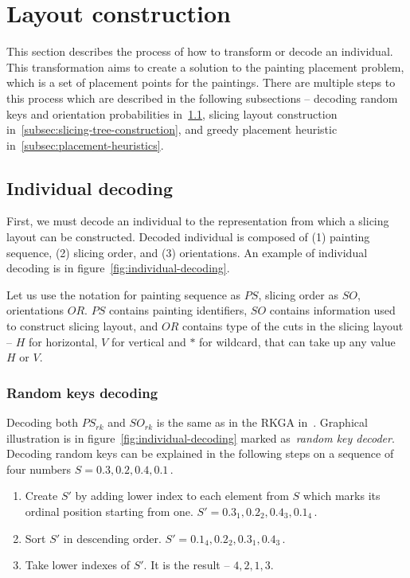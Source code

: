 \section{Layout construction}\label{sec:layout-construction}

This section describes the process of how to transform or decode an individual.
This transformation aims to create a solution to the painting placement problem,
which is a set of placement points for the paintings.
There are multiple steps to this process which are described in the following subsections
– decoding random keys and orientation probabilities in~\ref{subsec:individual-decoding},
slicing layout construction in~\ref{subsec:slicing-tree-construction},
and greedy placement heuristic in~\ref{subsec:placement-heuristics}.

\subsection{Individual decoding}\label{subsec:individual-decoding}
First, we must decode an individual to the representation from which a slicing layout can be constructed.
Decoded individual is composed of (1) painting sequence, (2) slicing order, and (3) orientations.
An example of individual decoding is in figure~\ref{fig:individual-decoding}.

Let us use the notation for painting sequence as $PS$, slicing order as $SO$, orientations $OR$.
$PS$ contains painting identifiers, $SO$ contains information used to construct slicing layout,
and $OR$ contains type of the cuts in the slicing layout – $H$ for horizontal, $V$ for vertical
and $*$ for wildcard, that can take up any value $H$ or $V$.

\subsubsection*{Random keys decoding}
Decoding both $PS_{rk}$ and $SO_{rk}$ is the same as in the RKGA in~\cite{beanGeneticAlgorithmsRandom1994}.
Graphical illustration is in figure~\ref{fig:individual-decoding} marked as~\textit{random key decoder}.
Decoding random keys can be explained in the following steps on a sequence of four numbers $S = 0.3, 0.2, 0.4, 0.1$\,.

\begin{enumerate}
    \item Create $S'$ by adding lower index to each element from $S$ which marks its ordinal position starting from one.
    $S' = 0.3_1, 0.2_2, 0.4_3, 0.1_4$\,.
    \item Sort $S'$ in descending order. $S' = 0.1_4, 0.2_2,  0.3_1, 0.4_3$\,.
    \item Take lower indexes of $S'$.
    It is the result – $4, 2, 1, 3$.
\end{enumerate}



